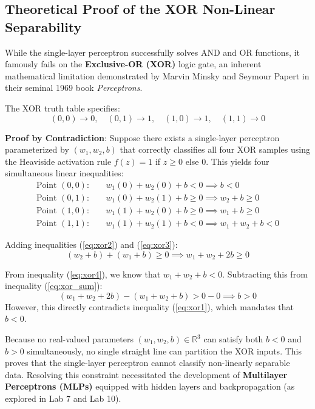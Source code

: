 \documentclass[12pt]{article}
\begin{document}
\subsection{Theoretical Proof of the XOR Non-Linear Separability}
While the single-layer perceptron successfully solves AND and OR functions, it famously fails on the \textbf{Exclusive-OR (XOR)} logic gate, an inherent mathematical limitation demonstrated by Marvin Minsky and Seymour Papert in their seminal 1969 book \textit{Perceptrons}.

The XOR truth table specifies:
\begin{equation}
    (0, 0) \to 0, \quad (0, 1) \to 1, \quad (1, 0) \to 1, \quad (1, 1) \to 0
\end{equation}

\textbf{Proof by Contradiction}:
Suppose there exists a single-layer perceptron parameterized by $(w_1, w_2, b)$ that correctly classifies all four XOR samples using the Heaviside activation rule $f(z) = 1$ if $z \ge 0$ else $0$. This yields four simultaneous linear inequalities:
\begin{align}
    \text{Point } (0, 0): \quad & w_1(0) + w_2(0) + b < 0 \implies b < 0 \label{eq:xor1} \\
    \text{Point } (0, 1): \quad & w_1(0) + w_2(1) + b \ge 0 \implies w_2 + b \ge 0 \label{eq:xor2} \\
    \text{Point } (1, 0): \quad & w_1(1) + w_2(0) + b \ge 0 \implies w_1 + b \ge 0 \label{eq:xor3} \\
    \text{Point } (1, 1): \quad & w_1(1) + w_2(1) + b < 0 \implies w_1 + w_2 + b < 0 \label{eq:xor4}
\end{align}

Adding inequalities (\ref{eq:xor2}) and (\ref{eq:xor3}):
\begin{equation}
    (w_2 + b) + (w_1 + b) \ge 0 \implies w_1 + w_2 + 2b \ge 0 \label{eq:xor_sum}
\end{equation}

From inequality (\ref{eq:xor4}), we know that $w_1 + w_2 + b < 0$. Subtracting this from inequality (\ref{eq:xor_sum}):
\begin{equation}
    (w_1 + w_2 + 2b) - (w_1 + w_2 + b) > 0 - 0 \implies b > 0
\end{equation}
However, this directly contradicts inequality (\ref{eq:xor1}), which mandates that $b < 0$. 

Because no real-valued parameters $(w_1, w_2, b) \in \mathbb{R}^3$ can satisfy both $b < 0$ and $b > 0$ simultaneously, no single straight line can partition the XOR inputs. This proves that the single-layer perceptron cannot classify non-linearly separable data. Resolving this constraint necessitated the development of \textbf{Multilayer Perceptrons (MLPs)} equipped with hidden layers and backpropagation (as explored in Lab 7 and Lab 10).
\end{document}
